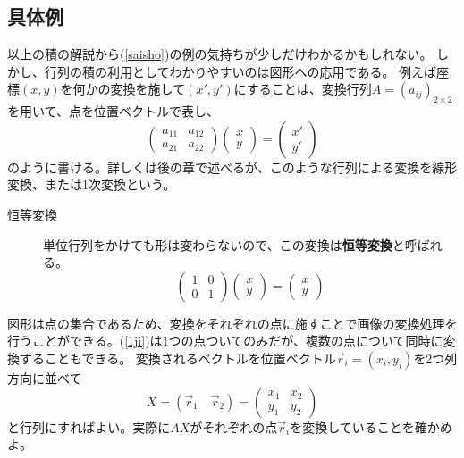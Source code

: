 \documentclass[10pt]{jsreport}
\theoremstyle{definition}%
\newcommand{\kakko}[1]{\left(#1 \right)} %
\newcommand{\vc}[1]{\overrightarrow{#1}}%
\numberwithin{equation}{section}%
\begin{document}
\subsection{具体例}
以上の積の解説から(\ref{saisho})の例の気持ちが少しだけわかるかもしれない。
しかし、行列の積の利用としてわかりやすいのは図形への応用である。
例えば座標$(x,y)$を何かの変換を施して$(x',y')$にすることは、変換行列$A=(a_{ij})_{2\times 2}$を用いて、点を位置ベクトルで表し、
\begin{equation}
 \label{1ji} \kakko{\begin{matrix}
 a_{11} & a_{12}  \\
 a_{21} & a_{22}
  \end{matrix}}
  \kakko{\begin{matrix}
 x  \\
 y
  \end{matrix}}=
  \kakko{\begin{matrix}
 x'  \\
 y'
  \end{matrix}}
\end{equation}
のように書ける。詳しくは後の章で述べるが、このような行列による変換を線形変換、または1次変換という。
\begin{framed}
  \begin{description}
    \item[恒等変換] 
    単位行列をかけても形は変わらないので、この変換は{\bf 恒等変換}と呼ばれる。
    \begin{equation}
      \kakko{\begin{matrix}
      1 & 0  \\
      0 & 1
      \end{matrix}}
      \kakko{\begin{matrix}
     x  \\
     y
      \end{matrix}}=
      \kakko{\begin{matrix}
     x  \\
     y
      \end{matrix}}
    \end{equation}
  \end{description}
\end{framed}
図形は点の集合であるため、変換をそれぞれの点に施すことで画像の変換処理を行うことができる。(\ref{1ji})は1つの点ついてのみだが、複数の点について同時に変換することもできる。
変換されるベクトルを位置ベクトル$\vc{r}_{i}=(x_{i},y_{i})$を2つ列方向に並べて
\begin{equation}
  X=(\vc{r}_{1}\quad \vc{r}_{2})=
  \kakko{
    \begin{matrix}
      x_{1} & x_{2}\\
      y_{1} & y_{2}
    \end{matrix}
  }
\end{equation}
と行列にすればよい。実際に$AX$がそれぞれの点$\vc{r}_{i}$を変換していることを確かめよ。
\end{document}
